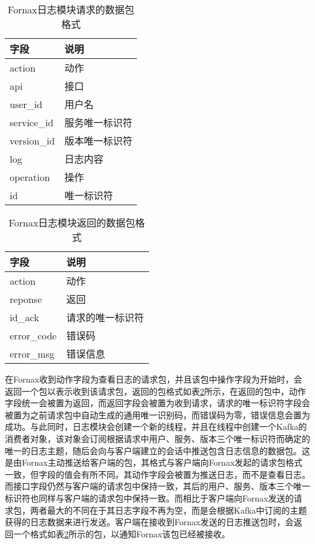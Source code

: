\begin{table}[!hpb]
  \centering
  \caption{Fornax日志模块请求的数据包格式}
  \label{tab:protocol-client}
  \begin{tabular}{ll} \toprule
    字段 & 说明 \\ \midrule
    action & 动作 \\
    api & 接口 \\
    user\_id & 用户名 \\
    service\_id & 服务唯一标识符 \\
    version\_id & 版本唯一标识符 \\
    log & 日志内容 \\
    operation & 操作 \\
    id & 唯一标识符 \\ \bottomrule
  \end{tabular}
\end{table}

\begin{table}[!hpb]
  \centering
  \caption{Fornax日志模块返回的数据包格式}
  \label{tab:protocol-server}
  \begin{tabular}{ll} \toprule
    字段 & 说明 \\ \midrule
    action & 动作 \\
    reponse & 返回 \\
    id\_ack & 请求的唯一标识符 \\
    error\_code & 错误码 \\
    error\_msg & 错误信息 \\ \bottomrule
  \end{tabular}
\end{table}

在Fornax收到动作字段为查看日志的请求包，并且该包中操作字段为开始时，会返回一个包以表示收到该请求包，返回的包格式如表\ref{tab:protocol-server}所示，在返回的包中，动作字段统一会被置为返回，而返回字段会被置为收到请求，请求的唯一标识符字段会被置为之前请求包中自动生成的通用唯一识别码，而错误码为零，错误信息会置为成功。与此同时，日志模块会创建一个新的线程，并且在线程中创建一个Kafka的消费者对象，该对象会订阅根据请求中用户、服务、版本三个唯一标识符而确定的唯一的日志主题，随后会向与客户端建立的会话中推送包含日志信息的数据包。这是由Fornax主动推送给客户端的包，其格式与客户端向Fornax发起的请求包格式一致，但字段的值会有所不同。其动作字段会被置为推送日志，而不是查看日志。而接口字段仍然与客户端的请求包中保持一致，其后的用户、服务、版本三个唯一标识符也同样与客户端的请求包中保持一致。而相比于客户端向Fornax发送的请求包，两者最大的不同在于其日志字段不再为空，而是会根据Kafka中订阅的主题获得的日志数据来进行发送。客户端在接收到Fornax发送的日志推送包时，会返回一个格式如表\ref{tab:protocol-server}所示的包，以通知Fornax该包已经被接收。

